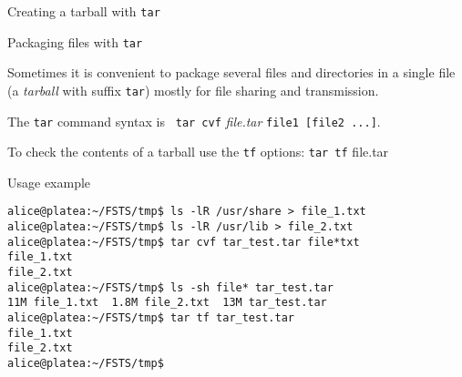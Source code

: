 \begin{frame}[t,fragile]{Creating a tarball with \alert{\texttt{tar}}}

  \vspace{-0.3cm}
  \begin{block}{Packaging files with \alert{\texttt{tar}}}
    {\footnotesize Sometimes it is convenient to package several files and directories
  in a single file (a \emph{tarball} with suffix \alert{\texttt{tar}}) mostly for file sharing and
  transmission.

  The  \alert{\texttt{tar}} command syntax is \alert{\texttt{ tar cvf} \emph{file.tar} \texttt{file1 [file2 ...]}}.

   To check
  the contents of a tarball use the \alert{\texttt{tf}} options: \alert{\texttt{tar tf} file.tar} 

  Usage example  }



{\scriptsize
        \begin{lstlisting}
alice@platea:~/FSTS/tmp$ ls -lR /usr/share > file_1.txt
alice@platea:~/FSTS/tmp$ ls -lR /usr/lib > file_2.txt
alice@platea:~/FSTS/tmp$ tar cvf tar_test.tar file*txt 
file_1.txt
file_2.txt
alice@platea:~/FSTS/tmp$ ls -sh file* tar_test.tar 
11M file_1.txt  1.8M file_2.txt  13M tar_test.tar
alice@platea:~/FSTS/tmp$ tar tf tar_test.tar 
file_1.txt
file_2.txt
alice@platea:~/FSTS/tmp$
        \end{lstlisting}

}
  \end{block}
  
\end{frame}
